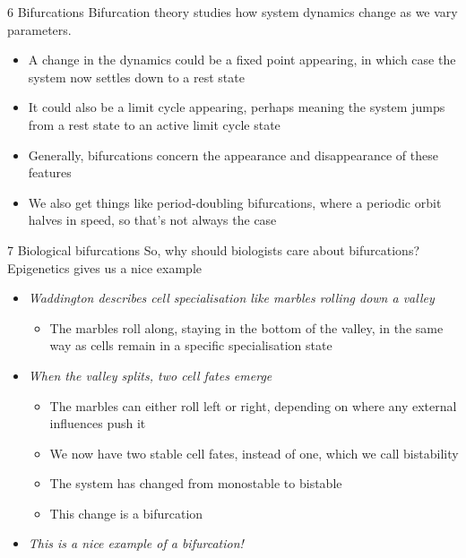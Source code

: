 \documentclass[presentation]{beamer}
\begin{document}
\begin{frame}[label={sec:orga68f3e2}]{6 Bifurcations}
Bifurcation theory studies how system dynamics change as we vary parameters.

\begin{itemize}
\item A change in the dynamics could be a fixed point appearing, in which case the system now settles down to a rest state
\item It could also be a limit cycle appearing, perhaps meaning the system jumps from a rest state to an active limit cycle state
\item Generally, bifurcations concern the appearance and disappearance of these features
\item We also get things like period-doubling bifurcations, where a periodic orbit halves in speed, so that's not always the case
\end{itemize}
\end{frame}

\begin{frame}[label={sec:org476f495}]{7 Biological bifurcations}
So, why should biologists care about bifurcations?
Epigenetics gives us a nice example

\vfill

\begin{itemize}
\item \emph{Waddington describes cell specialisation like marbles rolling down a valley}
\begin{itemize}
\item The marbles roll along, staying in the bottom of the valley, in the same way as cells remain in a specific specialisation state
\end{itemize}

\item \emph{When the valley splits, two cell fates emerge}
\begin{itemize}
\item The marbles can either roll left or right, depending on where any external influences push it
\item We now have two stable cell fates, instead of one, which we call bistability
\item The system has changed from monostable to bistable
\item This change is a bifurcation
\end{itemize}

\item \emph{This is a nice example of a bifurcation!}
\end{itemize}
\end{frame}
\end{document}
